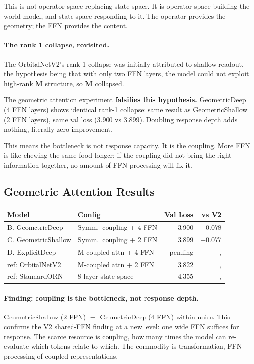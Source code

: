 \documentclass[11pt, a4paper]{article}
\newcommand{\M}{\mathbf{M}}
\theoremstyle{plain}
\theoremstyle{definition}
\theoremstyle{remark}
\begin{document}
This is not operator-space replacing state-space.
It is operator-space building the world model, and state-space responding to it.
The operator provides the geometry; the FFN provides the content.

\paragraph{The rank-1 collapse, revisited.}
The OrbitalNetV2's rank-1 collapse was initially attributed to shallow readout, the hypothesis being that with only two FFN layers, the model could not exploit high-rank $\M$ structure, so $\M$ collapsed.

The geometric attention experiment \textbf{falsifies this hypothesis.}
GeometricDeep (4 FFN layers) shows identical rank-1 collapse: same result as GeometricShallow (2 FFN layers), same val loss (3.900 vs 3.899).
Doubling response depth adds nothing, literally zero improvement.

This means the bottleneck is not response capacity.
It is the coupling.
More FFN is like chewing the same food longer: if the coupling did not bring the right information together, no amount of FFN processing will fix it.

\subsection{Geometric Attention Results}

\begin{center}\small
\begin{tabular}{llrr}
\toprule
\textbf{Model} & \textbf{Config} & \textbf{Val Loss} & \textbf{vs V2} \\
\midrule
B. GeometricDeep & Symm.\ coupling + 4 FFN & 3.900 & $+$0.078 \\
C. GeometricShallow & Symm.\ coupling + 2 FFN & 3.899 & $+$0.077 \\
D. ExplicitDeep & M-coupled attn + 4 FFN & pending & ,  \\
\midrule
ref: OrbitalNetV2 & M-coupled attn + 2 FFN & 3.822 & ,  \\
ref: StandardORN & 8-layer state-space & 4.355 & ,  \\
\bottomrule
\end{tabular}
\end{center}

\paragraph{Finding: coupling is the bottleneck, not response depth.}
GeometricShallow (2 FFN) $=$ GeometricDeep (4 FFN) within noise.
This confirms the V2 shared-FFN finding at a new level: one wide FFN suffices for response.
The scarce resource is coupling, how many times the model can re-evaluate which tokens relate to which.
The commodity is transformation, FFN processing of coupled representations.
\end{document}
